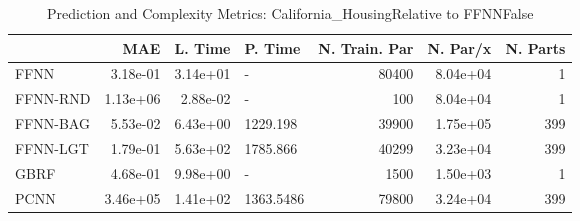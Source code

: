 \begin{table}
\centering
\caption{Prediction and Complexity Metrics: California_HousingRelative to FFNNFalse}
\label{tab__California_Housing__Fix_Neurons_QTrue}
\begin{tabular}{lrrlrrr}
\toprule
{} &      MAE &  L. Time &    P. Time &  N. Train. Par &  N. Par/x &  N. Parts \\
\midrule
FFNN     & 3.18e-01 & 3.14e+01 &          - &          80400 &  8.04e+04 &         1 \\
FFNN-RND & 1.13e+06 & 2.88e-02 &          - &            100 &  8.04e+04 &         1 \\
FFNN-BAG & 5.53e-02 & 6.43e+00 &   1229.198 &          39900 &  1.75e+05 &       399 \\
FFNN-LGT & 1.79e-01 & 5.63e+02 &   1785.866 &          40299 &  3.23e+04 &       399 \\
GBRF     & 4.68e-01 & 9.98e+00 &          - &           1500 &  1.50e+03 &         1 \\
PCNN     & 3.46e+05 & 1.41e+02 &  1363.5486 &          79800 &  3.24e+04 &       399 \\
\bottomrule
\end{tabular}
\end{table}
